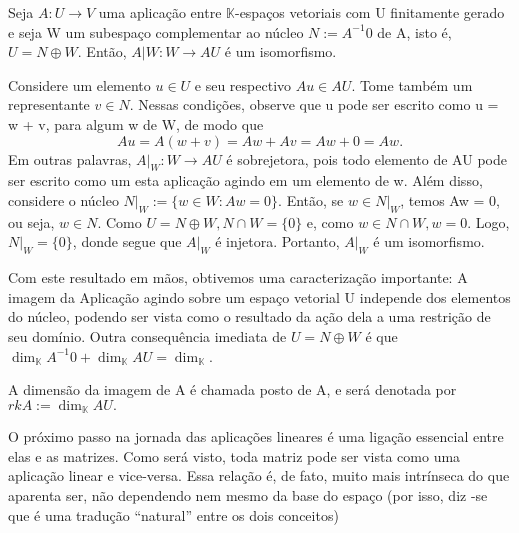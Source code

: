 \begin{proposition*}
    Seja $A:U\rightarrow{V}$ uma aplica\c c\~ao entre $\mathbb{K}$-espa\c cos vetoriais com U finitamente gerado e 
    seja W um subespa\c co complementar ao n\'ucleo $N:= A^{-1}0$ de A, isto \'e, $U = N \oplus W$. Ent\~ao, 
    $A|W: W \rightarrow AU$ \'e um isomorfismo.
\end{proposition*}
\begin{proof*}
    Considere um elemento $u\in{U}$ e seu respectivo $Au\in{AU}$. Tome tamb\'em um representante $v\in{N}$. Nessas
    condi\c c\~oes, observe que u pode ser escrito como u = w + v, para algum w de W, de modo que 
    $$
        Au = A(w + v) = Aw + Av = Aw + 0 = Aw.
    $$
    Em outras palavras, $A|_W: W\rightarrow AU$ \'e sobrejetora, pois todo elemento de AU pode ser escrito como
    um esta aplica\c c\~ao agindo em um elemento de w. Al\'em disso, considere o n\'ucleo $N|_W:=\{w\in{W}: Aw = 0\}.$
    Ent\~ao, se $w\in{N|_W}$, temos Aw = 0, ou seja, $w\in{N}.$ Como $U = N\oplus{W}, N\cap{W} = \{0\}$ e, como 
    $w\in{N\cap{W}}, w = 0.$ Logo, $N|_W = \{0\}$, donde segue que $A|_W$ \'e injetora. Portanto, $A|_W$ \'e um
    isomorfismo.
    \qedsymbol 
\end{proof*}
    Com este resultado em m\~aos, obtivemos uma caracteriza\c c\~ao importante: A imagem da Aplica\c c\~ao agindo
sobre um espa\c co vetorial U independe dos elementos do n\'ucleo, podendo ser vista como o resultado da a\c c\~ao
dela a uma restri\c c\~ao de seu dom\'inio. Outra consequ\^encia imediata de $U = N \oplus{W}$ \'e que 
$\dim_{\mathbb{K}}A^{-1}0 + \dim_{\mathbb{K}} AU = \dim_{\mathbb{K}}$.
\begin{def*}
    A dimens\~ao da imagem de A \'e chamada posto de A, e ser\'a denotada por $rkA:=\dim_{\mathbb{K}}AU.$
\end{def*}
    O pr\'oximo passo na jornada das aplica\c c\~oes lineares \'e uma liga\c c\~ao essencial entre elas e as matrizes.
Como ser\'a visto, toda matriz pode ser vista como uma aplica\c c\~ao linear e vice-versa. Essa rela\c c\~ao \'e,
de fato, muito mais intr\'inseca do que aparenta ser, n\~ao dependendo nem mesmo da base do espa\c co (por isso, diz
-se que \'e uma tradu\c c\~ao ``natural'' entre os dois conceitos)